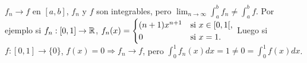 \begin{note}
  \(f_n \to f\) en \([a, b]\), \(f_n\) y \(f\) son integrables, pero \(\lim_{n \to \infty} \int_a^b f_n \neq \int_a^b f\). Por ejemplo si \(f_n: [0, 1] \to \mathbb{R} \), \(f_n(x) = \begin{cases}
      (n+1) x^{n+1} & \text{si } x \in \interval[open right]{0}{1}, \\
      0             & \text{si } x = 1.
    \end{cases} \) Luego si \(f: [0, 1] \to \{0\} \), \(f(x) = 0 \Rightarrow f_n \to f\), pero \(\int_0^1 f_n(x) dx = 1 \neq 0 = \int_0^1 f(x) dx\).
\end{note}
